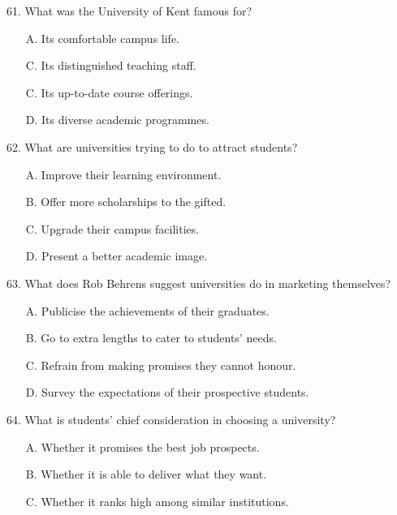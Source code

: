 \documentclass[UTF8,11pt]{ctexart}
\begin{document}
61. What was the University of Kent famous for?


\begin{itemize}[leftmargin=2em,itemsep=.2em,topsep=.4em]\item[A.] Its comfortable campus life.
\item[C.] Its distinguished teaching staff.
\end{itemize}

\begin{itemize}[leftmargin=2em,itemsep=.2em,topsep=.4em]\item[C.] Its up-to-date course offerings.
\item[D.] Its diverse academic programmes.
\end{itemize}

62. What are universities trying to do to attract students?


\begin{itemize}[leftmargin=2em,itemsep=.2em,topsep=.4em]\item[A.] Improve their learning environment.
\item[B.] Offer more scholarships to the gifted.
\item[C.] Upgrade their campus facilities.
\item[D.] Present a better academic image.
\end{itemize}

63. What does Rob Behrens suggest universities do in marketing themselves?


\begin{itemize}[leftmargin=2em,itemsep=.2em,topsep=.4em]\item[A.] Publicise the achievements of their graduates.
\item[B.] Go to extra lengths to cater to students’ needs.
\item[C.] Refrain from making promises they cannot honour.
\item[D.] Survey the expectations of their prospective students.
\end{itemize}

64. What is students’ chief consideration in choosing a university?


\begin{itemize}[leftmargin=2em,itemsep=.2em,topsep=.4em]\item[A.] Whether it promises the best job prospects.
\item[B.] Whether it is able to deliver what they want.
\item[C.] Whether it ranks high among similar institutions.
\end{itemize}
\end{document}
